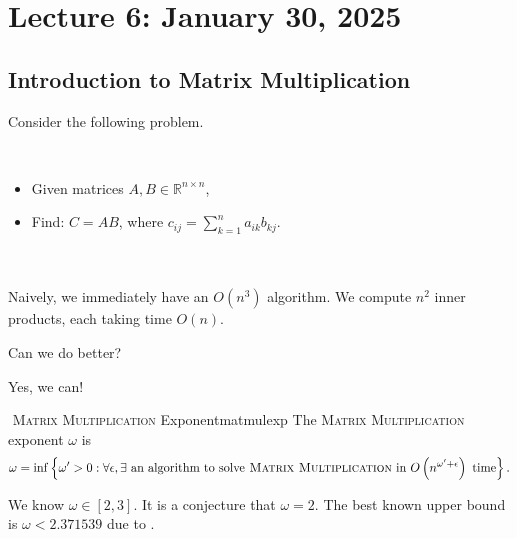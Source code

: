 \section{Lecture 6: January 30, 2025}

    \subsection{Introduction to Matrix Multiplication}

        Consider the following problem.
        \begin{compprob} \label{prob:matmul}
            \vphantom
            \\
            \begin{itemize}
                \item Given matrices \(A,B\in\mathbb{R}^{n\times n}\),
                \item Find: \(C=AB\), where \(c_{ij}=\sum_{k=1}^n a_{ik}b_{kj}\).
            \end{itemize}
        \end{compprob}
        \vphantom
        \\
        \\
        Naively, we immediately have an \(O(n^3)\) algorithm. We compute \(n^2\) inner products, each taking time \(O(n)\).
        \begin{question*}
            Can we do better?
        \end{question*}
        \begin{answer*}
            Yes, we can!
        \end{answer*}
        \begin{definition}{\Stop\,\,\textsc{Matrix Multiplication} Exponent}{matmulexp}
            The \textsc{Matrix Multiplication} exponent \(\omega\) is
            \begin{equation*}
                \omega=\inf\left\{\omega'>0:\forall\epsilon, \exists \text{ an algorithm to solve}\textsc{ Matrix Multiplication}\text{ in }O\left(n^{\omega'+\epsilon}\right)\text{ time}\right\}.
            \end{equation*}
        \end{definition}
        \begin{remark*}
            We know \(\omega\in[2,3]\). It is a conjecture that \(\omega=2\). The best known upper bound is \(\omega<2.371539\) due to \cite{alman2024asymmetry}.
        \end{remark*}
        \vphantom
